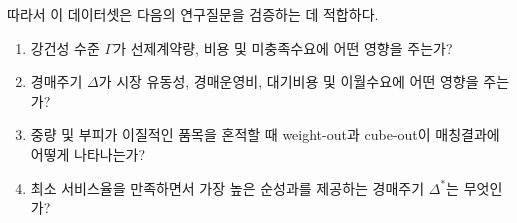 \documentclass[11pt,a4paper]{article}
\begin{document}
따라서 이 데이터셋은 다음의 연구질문을 검증하는 데 적합하다.
\begin{enumerate}[label=(\arabic*)]
    \item 강건성 수준 $\Gamma$가 선제계약량, 비용 및 미충족수요에 어떤 영향을 주는가?
    \item 경매주기 $\Delta$가 시장 유동성, 경매운영비, 대기비용 및 이월수요에 어떤 영향을 주는가?
    \item 중량 및 부피가 이질적인 품목을 혼적할 때 weight-out과 cube-out이 매칭결과에 어떻게 나타나는가?
    \item 최소 서비스율을 만족하면서 가장 높은 순성과를 제공하는 경매주기 $\Delta^*$는 무엇인가?
\end{enumerate}
\end{document}
